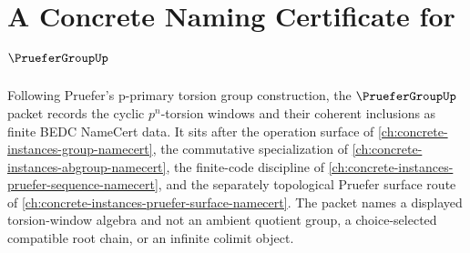 \chapter{A Concrete Naming Certificate for $\PrueferGroupUp$}
\label{ch:concrete-instances-pruefer-group-namecert}

Following Pruefer's p-primary torsion group construction, the $\PrueferGroupUp$ packet records the cyclic $p^n$-torsion windows and their coherent inclusions as finite BEDC NameCert data. It sits after the operation surface of \autoref{ch:concrete-instances-group-namecert}, the commutative specialization of \autoref{ch:concrete-instances-abgroup-namecert}, the finite-code discipline of \autoref{ch:concrete-instances-pruefer-sequence-namecert}, and the separately topological Pruefer surface route of \autoref{ch:concrete-instances-pruefer-surface-namecert}. The packet names a displayed torsion-window algebra and not an ambient quotient group, a choice-selected compatible root chain, or an infinite colimit object.

